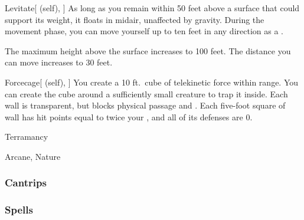 \lowercase{\hypertarget{spell:Levitate}{}}\label{spell:Levitate}
\begin{attuneability}[Rank 4]{\hypertarget{spell:Levitate}{Levitate}}[ (self), ]
As long as you remain within 50 feet above a surface that could support its weight, it floats in midair, unaffected by gravity.
During the movement phase, you can move yourself up to ten feet in any direction as a .

\rankline
{} The maximum height above the surface increases to 100 feet.
 The distance you can move increases to 30 feet.
\end{attuneability}
\vspace{0.25em}



\lowercase{\hypertarget{spell:Forcecage}{}}\label{spell:Forcecage}
\begin{attuneability}[Rank 8]{\hypertarget{spell:Forcecage}{Forcecage}}[ (self), ]
\targetrule
You create a 10 ft.\ cube of telekinetic force within \rngmed range.
You can create the cube around a sufficiently small creature to trap it inside.
Each wall is transparent, but blocks physical passage and .
Each five-foot square of wall has hit points equal to twice your , and all of its defenses are 0.
\end{attuneability}
\vspace{0.25em}


\newpage
\begin{spellsection}{Terramancy}

\begin{spellheader}
\end{spellheader}


 Arcane, Nature

\subsubsection{Cantrips}


\end{spellsection}


\subsubsection{Spells}


